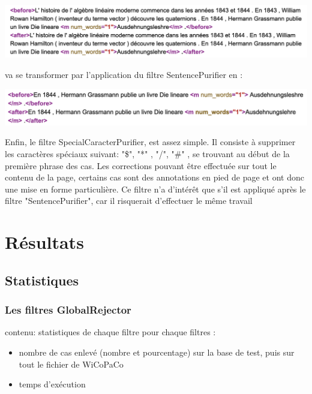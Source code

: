 \documentclass{article}
\begin{document}
\begin{center}
\includegraphics[width=14cm]{exemple14.png} %
\end{center}
va se transformer par l'application du filtre SentencePurifier en : 
\begin{center}
\includegraphics[width=14cm]{exemple15.png} %
\end{center}
Enfin, le filtre SpecialCaracterPurifier, est assez simple. Il consiste \`{a} supprimer les caract\`{e}res sp\'{e}ciaux suivant: "\$", "*" , "/", "\#" , se trouvant au d\'{e}but de la premi\`{e}re phrase des cas. Les corrections pouvant \^{e}tre effectu\'{e}e sur tout le contenu de la page, certains cas sont des annotations en pied de page et ont donc une mise en forme particuli\`{e}re.
Ce filtre n'a d'int\'{e}r\^{e}t que s'il est appliqu\'{e} apr\`{e}s le filtre "SentencePurifier", car il risquerait d'effectuer le m\^{e}me travail

\section{R\'{e}sultats}

\subsection{Statistiques}

\subsubsection{Les filtres GlobalRejector}
contenu:
statistiques de chaque filtre 
pour chaque filtres :
\begin{itemize}
\item nombre de cas enlev\'{e} (nombre et pourcentage) sur la base de test, puis sur tout le fichier de WiCoPaCo
\item temps d'ex\'{e}cution
\end{itemize}
\end{document}
